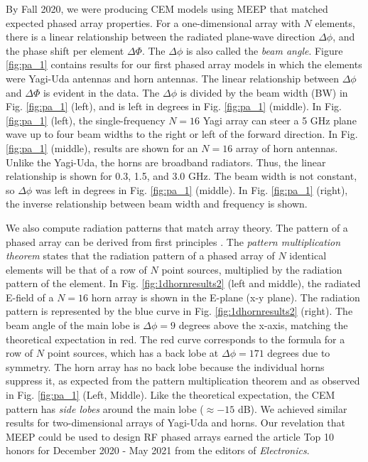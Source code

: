 \documentclass[10pt]{amsart}
\theoremstyle{definition}
\numberwithin{equation}{section}
\begin{document}
By Fall 2020, we were producing CEM models using MEEP that matched expected phased array properties.  For a one-dimensional array with $N$ elements, there is a linear relationship between the radiated plane-wave direction $\Delta \phi$, and the phase shift per element $\Delta \Phi$.  The $\Delta \phi$ is also called the \textit{beam angle}.  Figure \ref{fig:pa_1} contains results for our first phased array models in which the elements were Yagi-Uda antennas and horn antennas.  The linear relationship between $\Delta \phi$ and $\Delta \Phi$ is evident in the data.  The $\Delta \phi$ is divided by the beam width (BW) in Fig. \ref{fig:pa_1} (left), and is left in degrees in Fig. \ref{fig:pa_1} (middle).  In Fig. \ref{fig:pa_1} (left), the single-frequency $N=16$ Yagi array can steer a 5 GHz plane wave up to four beam widths to the right or left of the forward direction.  In Fig. \ref{fig:pa_1} (middle), results are shown for an $N=16$ array of horn antennas.  Unlike the Yagi-Uda, the horns are broadband radiators.  Thus, the linear relationship is shown for 0.3, 1.5, and 3.0 GHz.  The beam width is not constant, so $\Delta \phi$ was left in degrees in Fig. \ref{fig:pa_1} (middle).  In Fig. \ref{fig:pa_1} (right), the inverse relationship between beam width and frequency is shown. 

We also compute radiation patterns that match array theory.  The pattern of a phased array can be derived from first principles \cite{electronics10040415}.  The \textit{pattern multiplication theorem} states that the radiation pattern of a phased array of $N$ identical elements will be that of a row of $N$ point sources, multiplied by the radiation pattern of the element.  In Fig. \ref{fig:1dhornresults2} (left and middle), the radiated E-field of a $N=16$ horn array is shown in the E-plane (x-y plane).  The radiation pattern is represented by the blue curve in Fig. \ref{fig:1dhornresults2} (right).  The beam angle of the main lobe is $\Delta \phi = 9$ degrees above the x-axis, matching the theoretical expectation in red.  The red curve corresponds to the formula for a row of $N$ point sources, which has a back lobe at $\Delta \phi = 171$ degrees due to symmetry.  The horn array has no back lobe because the individual horns suppress it, as expected from the pattern multiplication theorem and as observed in Fig. \ref{fig:pa_1} (Left, Middle).  Like the theoretical expectation, the CEM pattern has \textit{side lobes} around the main lobe ($\approx -15$ dB).  We achieved similar results for two-dimensional arrays of Yagi-Uda and horns.  Our revelation that MEEP could be used to design RF phased arrays earned the article Top 10 honors for December 2020 - May 2021 from the editors of \textit{Electronics}. 
\end{document}

